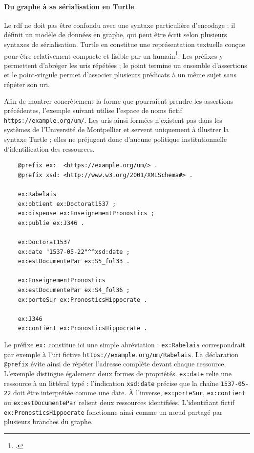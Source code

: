 \paragraph{Du graphe à sa sérialisation en Turtle}

Le \gls{rdf} ne doit pas être confondu avec une syntaxe particulière d'encodage : il définit un modèle de données en graphe, qui peut être écrit selon plusieurs syntaxes de sérialisation. Turtle en constitue une représentation textuelle conçue pour être relativement compacte et lisible par un humain\footcite{W3CTurtle2014}. Les préfixes y permettent d'abréger les \glspl{uri} répétées ; le point termine un ensemble d'assertions et le point-virgule permet d'associer plusieurs prédicats à un même sujet sans répéter son \gls{uri}.

Afin de montrer concrètement la forme que pourraient prendre les assertions précédentes, l'exemple suivant utilise l'espace de noms fictif \verb|https://example.org/um/|. Les \glspl{uri} ainsi formées n'existent pas dans les systèmes de l'Université de Montpellier et servent uniquement à illustrer la syntaxe Turtle ; elles ne préjugent donc d'aucune politique institutionnelle d'identification des ressources.

\begin{verbatim}
	@prefix ex:  <https://example.org/um/> .
	@prefix xsd: <http://www.w3.org/2001/XMLSchema#> .
	
	ex:Rabelais
	ex:obtient ex:Doctorat1537 ;
	ex:dispense ex:EnseignementPronostics ;
	ex:publie ex:J346 .
	
	ex:Doctorat1537
	ex:date "1537-05-22"^^xsd:date ;
	ex:estDocumentePar ex:S5_fol33 .
	
	ex:EnseignementPronostics
	ex:estDocumentePar ex:S4_fol36 ;
	ex:porteSur ex:PronosticsHippocrate .
	
	ex:J346
	ex:contient ex:PronosticsHippocrate .
\end{verbatim}

Le préfixe \verb|ex:| constitue ici une simple abréviation : \verb|ex:Rabelais| correspondrait par exemple à l'\gls{uri} fictive \verb|https://example.org/um/Rabelais|. La déclaration \verb|@prefix| évite ainsi de répéter l'adresse complète devant chaque ressource. L'exemple distingue également deux formes de propriétés. \verb|ex:date| relie une ressource à un littéral typé : l'indication \verb|xsd:date| précise que la chaîne \verb|1537-05-22| doit être interprétée comme une date. À l'inverse, \verb|ex:porteSur|, \verb|ex:contient| ou \verb|ex:estDocumentePar| relient deux ressources identifiées. L'identifiant fictif \verb|ex:PronosticsHippocrate| fonctionne ainsi comme un nœud partagé par plusieurs branches du graphe.

